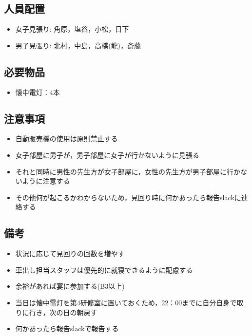 




\subsection{人員配置}
\begin{itemize}
\item 女子見張り: 角原，塩谷，小松，日下
\item 男子見張り: 北村，中島，高橋(龍)，斎藤
\end{itemize}


\subsection{必要物品}
\begin{itemize}
\item 懐中電灯：4本
\end{itemize}


\subsection{注意事項}
\begin{itemize}
\item 自動販売機の使用は原則禁止する
\item 女子部屋に男子が，男子部屋に女子が行かないように見張る
\item それと同時に男性の先生方が女子部屋に，女性の先生方が男子部屋に行かないように注意する
\item その他何が起こるかわからないため，見回り時に何かあったら報告slackに連絡する
\end{itemize}

\subsection{備考}
\begin{itemize}
\item 状況に応じて見回りの回数を増やす
\item 車出し担当スタッフは優先的に就寝できるように配慮する
\item 余裕があれば宴に参加する(B3以上)
\item 当日は懐中電灯を第4研修室に置いておくため，22：00までに自分自身で取りに行き，次の日の朝戻す
\item 何かあったら報告slackで報告する
\end{itemize}

%
